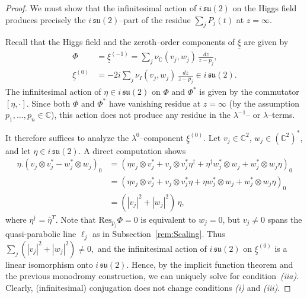 \documentclass[12pt,a4paper]{amsart}
\theoremstyle{definition}
\theoremstyle{remark}
\newcommand{\C}{\mathbb C}
\newcommand{\Res}{\mathrm{Res}}
\begin{document}
\begin{proof}
We must show that the infinitesimal action of $i\,\mathfrak{su}(2)$ on the Higgs field
produces precisely the $i\,\mathfrak{su}(2)$--part of the residue
$\sum_j P_j(t)$ at $z=\infty$.

Recall that the Higgs field and the zeroth--order components of $\underline\xi$ are given by
\begin{equation}\label{eq:higgs-components}
\begin{aligned}
\Phi &= \underline\xi^{(-1)}
      = \sum_j \nu_{\C}(v_j,w_j)\,\frac{dz}{z-p_j},\\
\underline\xi^{(0)} &= -2i\sum_j \nu_{I}(v_j,w_j)\,\frac{dz}{z-p_j}
\in i\,\mathfrak{su}(2).
\end{aligned}
\end{equation}
The infinitesimal action of $\eta\in i\,\mathfrak{su}(2)$ on $\Phi$ and $\Phi^{*}$ is given by
the commutator $[\eta,\cdot]$.
Since both $\Phi$ and $\Phi^{*}$ have vanishing residue at $z=\infty$
(by the assumption $p_1,\dots,p_n\in\C$),
this action does not produce any residue in the $\lambda^{-1}$-- or $\lambda$--terms.

It therefore suffices to analyze the $\lambda^{0}$--component $\underline\xi^{(0)}$.
Let $v_j\in\C^2$, $w_j\in(\C^2)^*$, and let $\eta\in i\,\mathfrak{su}(2)$.
A direct computation shows
\begin{equation}\label{eq:infinitesimal-action}
\begin{aligned}
\eta.(v_j\otimes v_j^* - w_j^*\otimes w_j)_0
&=
(\eta v_j\otimes v_j^* + v_j\otimes v_j^*\eta^\dagger
 + \eta^\dagger w_j^*\otimes w_j + w_j^*\otimes w_j\eta)_0\\
&=
(\eta v_j\otimes v_j^* + v_j\otimes v_j^*\eta
 + \eta w_j^*\otimes w_j + w_j^*\otimes w_j\eta)_0\\
&=
(|v_j|^2 + |w_j|^2)\,\eta,
\end{aligned}
\end{equation}
where $\eta^\dagger=\bar\eta^T$.
Note that  $\Res_{p_j}\Phi=0$  is equivalent to $w_j=0$, 
but $v_j\neq0$ spans the quasi-parabolic line $\ell_j$ as in Subsection~\ref{rem:Scaling}.
Thus
$
\sum_j (|v_j|^2 + |w_j|^2)\neq0,
$
and  the infinitesimal action of $i\,\mathfrak{su}(2)$ on
$\underline\xi^{(0)}$ is a linear isomorphism onto $i\,\mathfrak{su}(2)$.
Hence, by the implicit function theorem and the previous monodromy construction,
we can uniquely solve for condition~\emph{(iia)}.
Clearly, (infinitesimal) conjugation does not change conditions \emph{(i)} and \emph{(iii)}.
\end{proof}
\end{document}
